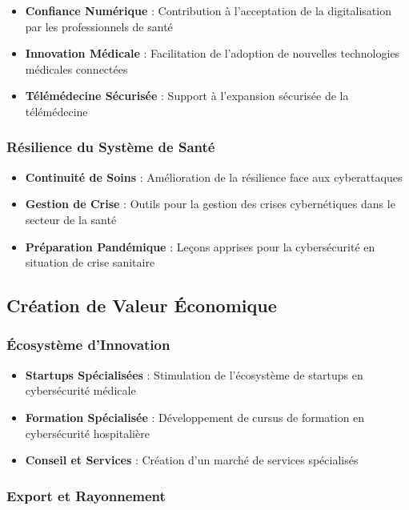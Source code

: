 \begin{itemize}
    \item \textbf{Confiance Numérique} : Contribution à l'acceptation de la digitalisation par les professionnels de santé
    \item \textbf{Innovation Médicale} : Facilitation de l'adoption de nouvelles technologies médicales connectées
    \item \textbf{Télémédecine Sécurisée} : Support à l'expansion sécurisée de la télémédecine
\end{itemize}

\subsubsection{Résilience du Système de Santé}

\begin{itemize}
    \item \textbf{Continuité de Soins} : Amélioration de la résilience face aux cyberattaques
    \item \textbf{Gestion de Crise} : Outils pour la gestion des crises cybernétiques dans le secteur de la santé
    \item \textbf{Préparation Pandémique} : Leçons apprises pour la cybersécurité en situation de crise sanitaire
\end{itemize}

\subsection{Création de Valeur Économique}

\subsubsection{Écosystème d'Innovation}

\begin{itemize}
    \item \textbf{Startups Spécialisées} : Stimulation de l'écosystème de startups en cybersécurité médicale
    \item \textbf{Formation Spécialisée} : Développement de cursus de formation en cybersécurité hospitalière
    \item \textbf{Conseil et Services} : Création d'un marché de services spécialisés
\end{itemize}

\subsubsection{Export et Rayonnement}

